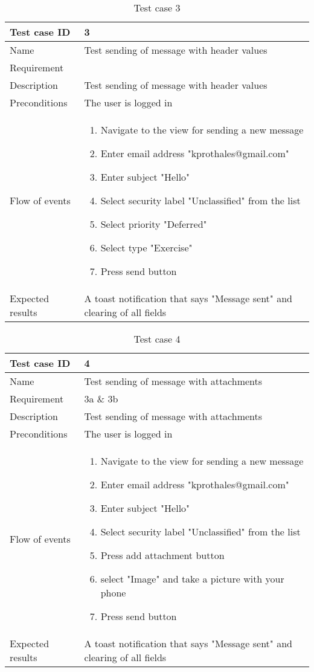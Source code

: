 \begin{table}
\begin{tabular}{l|p{10cm}}
Test case ID & 3 \\ \hline
Name & Test sending of message with header values\\ \hline
Requirement & \\ \hline
Description & Test sending of message with header values\\ \hline
Preconditions & The user is logged in\\ \hline
Flow of events & 
\begin{enumerate}
\item{}Navigate to the view for sending a new message
\item{}Enter email address "kprothales@gmail.com"
\item{}Enter subject "Hello"
\item{}Select security label "Unclassified" from the list
\item{}Select priority "Deferred"
\item{}Select type "Exercise"
\item{}Press send button
\end{enumerate} \\ \hline
Expected results & A toast notification that says "Message sent" and clearing of all fields
\end{tabular}
\caption{Test case 3} \label{tab:case3}
\end{table}

\begin{table}
\begin{tabular}{l|p{10cm}}
Test case ID & 4 \\ \hline
Name & Test sending of message with attachments\\ \hline
Requirement & 3a \& 3b\\ \hline
Description & Test sending of message with attachments\\ \hline
Preconditions & The user is logged in\\ \hline
Flow of events & 
\begin{enumerate}
\item{}Navigate to the view for sending a new message
\item{}Enter email address "kprothales@gmail.com"
\item{}Enter subject "Hello"
\item{}Select security label "Unclassified" from the list
\item{}Press add attachment button
\item{}select "Image" and take a picture with your phone
\item{}Press send button
\end{enumerate} \\ \hline
Expected results & A toast notification that says "Message sent" and clearing of all fields
\end{tabular}
\caption{Test case 4} \label{tab:case4}
\end{table}


